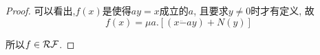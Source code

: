 \begin{proof}
    可以看出,$f(x)$是使得$ay=x$成立的$a$, 且要求$y\neq 0$时才有定义, 故
    $$f(x)=\mu a.[(x\ddot{-}ay)+N(y)]$$
	
    所以$f\in\mathcal{RF}$.
\end{proof}